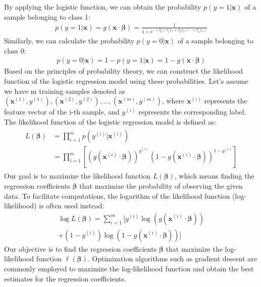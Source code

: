 \documentclass[conference]{IEEEconf}
\begin{document}
By applying the logistic function, we can obtain the probability $p(y = 1|\mathbf{x})$ of a sample belonging to class 1:
\begin{eqnarray}
p(y = 1|\mathbf{x}) = g(\mathbf{x} \cdot \boldsymbol{\beta}) = \frac{1}{1 + e^{-(\beta_0 + \beta_1x_1 + \beta_2x_2 + \ldots + \beta_nx_n)}}
\end{eqnarray}
Similarly, we can calculate the probability $p(y = 0|\mathbf{x})$ of a sample belonging to class 0:
\begin{eqnarray}
p(y = 0|\mathbf{x}) = 1 - p(y = 1|\mathbf{x}) = 1 - g(\mathbf{x} \cdot \boldsymbol{\beta})
\end{eqnarray}
Based on the principles of probability theory, we can construct the likelihood function of the logistic regression model using these probabilities. Let's assume we have m training samples denoted as $(\mathbf{x}^{(1)}, y^{(1)}), (\mathbf{x}^{(2)}, y^{(2)}), \ldots, (\mathbf{x}^{(m)}, y^{(m)})$, where $\mathbf{x}^{(i)}$ represents the feature vector of the i-th sample, and $y^{(i)}$ represents the corresponding label.
The likelihood function of the logistic regression model is defined as:
\begin{eqnarray}
	\begin{aligned}
	L(\boldsymbol{\beta}) & = \prod_{i=1}^{m} p(y^{(i)}|\mathbf{x}^{(i)}) 
	\\& = \prod_{i=1}^{m} \left[ (g(\mathbf{x}^{(i)} \cdot \boldsymbol{\beta}))^{y^{(i)}} (1 - g(\mathbf{x}^{(i)} \cdot \boldsymbol{\beta}))^{1-y^{(i)}} \right]
	\end{aligned}
\end{eqnarray}
Our goal is to maximize the likelihood function $L(\boldsymbol{\beta})$, which means finding the regression coefficients $\boldsymbol{\beta}$ that maximize the probability of observing the given data. To facilitate computations, the logarithm of the likelihood function (log-likelihood) is often used instead:
\begin{equation}
\begin{split}
	\log L(\boldsymbol{\beta}) = \sum_{i=1}^{m} [y^{(i)} \log(g(\mathbf{x}^{(i)} \cdot \boldsymbol{\beta})) \\
	+ (1-y^{(i)}) \log(1 - g(\mathbf{x}^{(i)} \cdot \boldsymbol{\beta}))]
\end{split}
\end{equation}
Our objective is to find the regression coefficients $\boldsymbol{\beta}$ that maximize the log-likelihood function $\ell(\boldsymbol{\beta})$. Optimization algorithms such as gradient descent are commonly employed to maximize the log-likelihood function and obtain the best estimates for the regression coefficients.\\
\end{document}
